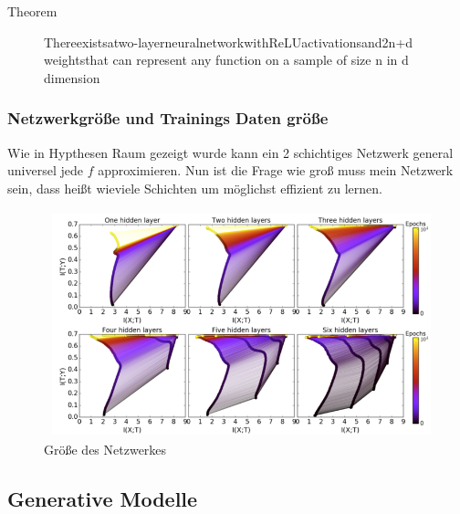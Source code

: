 \documentclass{llncs}
\begin{document}
\begin{description}
	\item[Theorem] Thereexistsatwo-layerneuralnetworkwithReLUactivationsand2n+d weightsthat can represent any function on a sample of size n in d dimension \cite{hypothesenraum}	
	
\end{description}


\subsubsection{Netzwerkgröße und Trainings Daten größe}

Wie in Hypthesen Raum gezeigt wurde kann ein 2 schichtiges Netzwerk general universel jede $f$ approximieren. Nun ist die Frage wie groß muss mein Netzwerk sein, dass heißt wieviele Schichten um möglichst effizient zu lernen.

\begin{figure}[htbp] 
	\centering
	\includegraphics[width=1.0\textwidth]{networksize.png}
	\caption{Größe des Netzwerkes}
	\label{fig:Bild1}
\end{figure}

\subsection{Generative Modelle}
\end{document}
